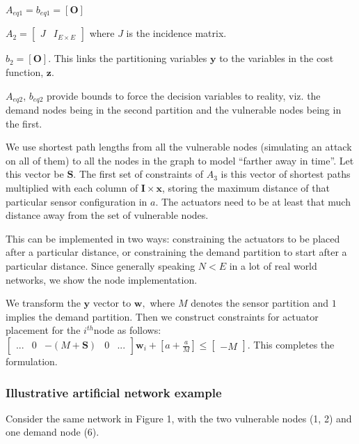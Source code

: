 \documentclass[authoryear,preprint,review,12pt]{elsarticle}
\begin{document}
$A_{eq1}=b_{eq1}=\mathbf{\left[O\right]}$

$A_{2}=\left[\begin{array}{cc}
J & I_{E\times E}\end{array}\right]$ where $J$ is the incidence matrix.

$b_{2}=\left[\mathbf{O}\right]$. This links the partitioning variables
$\mathbf{y}$ to the variables in the cost function, $\mathbf{z}$.

$A_{eq2}$, $b_{eq2}$ provide bounds to force the decision variables
to reality, viz. the demand nodes being in the second partition and
the vulnerable nodes being in the first.

We use shortest path lengths from all the vulnerable nodes (simulating
an attack on all of them) to all the nodes in the graph to model ``farther
away in time''. Let this vector be $\mathbf{S}$. The first set of
constraints of $A_{3}$ is this vector of shortest paths multiplied
with each column of $\mathbf{I\times x}$, storing the maximum distance
of that particular sensor configuration in $a$. The actuators need
to be at least that much distance away from the set of vulnerable
nodes.

This can be implemented in two ways: constraining the actuators to
be placed after a particular distance, or constraining the demand
partition to start after a particular distance. Since generally speaking
$N<E$ in a lot of real world networks, we show the node implementation.

We transform the $\mathbf{y}$ vector to $\mathbf{w},$ where $M$
denotes the sensor partition and $1$ implies the demand partition.
Then we construct constraints for actuator placement for the $i^{th}$node
as follows: $\left[\begin{array}{ccccc}
... & 0 & -(M+\mathbf{S}) & 0 & ...\end{array}\right]\mathbf{w}_{i}+\left[a+\frac{a}{M}\right]\leq\left[\begin{array}{c}
-M\end{array}\right]$. This completes the formulation.


\subsubsection{Illustrative artificial network example}

Consider the same network in Figure 1, with the two vulnerable nodes
(1, 2) and one demand node (6).
\end{document}
